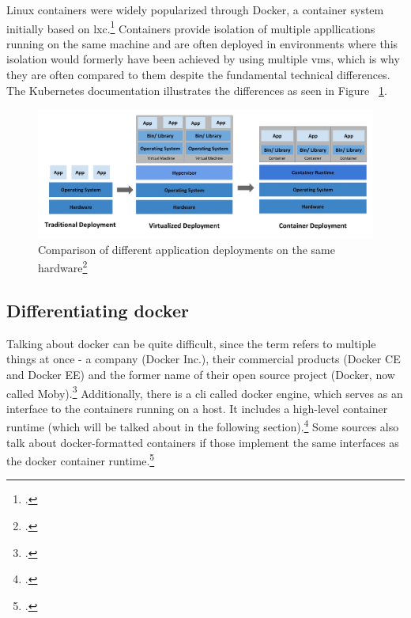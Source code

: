 Linux containers were widely popularized through Docker, a container system initially based on \gls{lxc}.\footcite{containerHistory}
Containers provide isolation of multiple appllications running on the same machine and are often deployed in environments where this isolation would formerly have been achieved by using multiple \gls{vm}s, which is why they are often compared to them despite the fundamental technical differences. The Kubernetes documentation illustrates the differences as seen in Figure ~\ref{fig:VMsVsContainers}.

\begin{figure}[H]
\includegraphics[scale=0.3]{pictures/VMsVsContainers.jpg} 
\caption{Comparison of different application deployments on the same hardware\protect\footcite{k8sDocsVmsContainers}}
\label{fig:VMsVsContainers}
\end{figure}

\subsection{Differentiating docker}
Talking about docker can be quite difficult, since the term refers to multiple things at once - a company (Docker Inc.), their commercial products (Docker CE and Docker EE) and the former name of their open source project (Docker, now called Moby).\footcite{dockerMoby}
Additionally, there is a \gls{cli} called docker engine, which serves as an interface to the containers running on a host. It includes a high-level container runtime (which will be talked about in the following section).\footcite{dockerEngine}
Some sources also talk about docker-formatted containers if those implement the same interfaces as the docker container runtime.\footcite{dockerFormatted}

